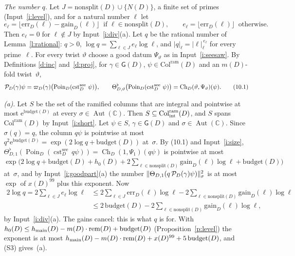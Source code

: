 \documentclass[11pt,a4paper]{article}
\makeatletter
\theoremstyle{plainx}
\theoremstyle{uprightx}
\renewenvironment{proof}[1][Proof]{\par\pushQED{\qed}\normalfont\topsep0pt\partopsep0pt
  \trivlist\item[\hskip\labelsep\itshape #1.]\ignorespaces}{\popQED\endtrivlist\@endpefalse}
\newcommand{\C}{\mathbb{C}}
\newcommand{\ee}{\mathrm{e}}
\newcommand{\AutC}{\operatorname{Aut}(\C)}
\newcommand{\scx}[1]{x(#1)}
\newcommand{\Dm}[1]{m(#1)}
\newcommand{\budget}[1]{\mathrm{budget}(#1)}
\newcommand{\hrow}[1]{h_{0}(#1)}
\newcommand{\Colram}[1]{\mathrm{Col}^{\mathrm{ram}}(#1)}
\newcommand{\GD}[1]{\mathsf{G}(#1)}
\newcommand{\Poin}[1]{\operatorname{Poin}_{#1}}
\newcommand{\gpt}[2]{\varpi_{#1}(#2)}
\newcommand{\Th}[2]{\Theta_{#1,#2}}
\newcommand{\Thf}[2]{\Theta^{\flat}_{#1,#2}}
\newcommand{\nsq}[2]{\|#1\|^{2}_{#2}}
\newcommand{\gain}[2]{\mathrm{gain}_{#1}(#2)}
\newcommand{\err}[2]{\mathrm{err}_{#1}(#2)}
\newcommand{\nonsplit}[1]{\mathrm{nonsplit}(#1)}
\newcommand{\Ch}[2]{\operatorname{Ch}_{#1}(#2)}
\newcommand{\cst}[2]{\operatorname{cst}^{\mathrm{#1}}_{#2}}
\makeatother
\begin{document}
\begin{proof}
\emph{The number $q$.} Let $J=\nonsplit{D}\cup\{N(D)\}$, a finite set of primes (Input~\ref{i:level}), and for a
natural number $\ell$ let
\[e_\ell=\bigl\lfloor\err{D}{\ell}-\gain{D}{\ell}\bigr\rfloor\ \text{ if }\ell\in\nonsplit{D},\qquad
e_\ell=\bigl\lfloor\err{D}{\ell}\bigr\rfloor\ \text{ otherwise.}\]
Then $e_\ell=0$ for $\ell\notin J$ by Input~\ref{i:div}(a). Let $q$ be the rational number of Lemma~\ref{l:rational}:
$q>0$, $\log q=\sum_{\ell\in J}e_\ell\log\ell$, and $|q|_\ell=|\ell|_\ell^{\,e_\ell}$ for every prime~$\ell$. For every
twist $\vartheta$ choose a good datum $\Psi_\vartheta$ as in Input~\ref{i:seesaw}. By Definitions \ref{d:inc}
and~\ref{d:proj}, for $\gamma\in\GD{D}$, $\psi\in\Colram{D}$ and an $\Dm{D}$-fold twist~$\vartheta$,
\[
\projectedPoincare{D}{\gamma}{\psi}=\gpt{D}{\gamma}\bigl(\Poin{D}(\cst{see}{D}\,\psi)\bigr),\qquad
\Thf{D}{\vartheta}\bigl(\Poin{D}(\cst{see}{D}\,\psi)\bigr)=\Ch{D}{\vartheta,\Psi_\vartheta}(\psi).\tag{10.1}
\]

\emph{(a).} Let $S$ be the set of the ramified columns that are integral and pointwise at most
$\ee^{\budget{D}}$ at every $\sigma\in\AutC$. Then $S\subseteq\mathrm{Col}^{\mathrm{ram}}_{\mathrm{int}}(D)$, and $S$ spans $\Colram{D}$ by
Input~\ref{i:short}. Let $\psi\in S$, $\gamma\in\GD{D}$ and $\sigma\in\AutC$. Since $\sigma(q)=q$, the column $q\psi$
is pointwise at most $q^{2}\ee^{\budget{D}}=\exp(2\log q+\budget{D})$ at~$\sigma$. By (10.1) and Input~\ref{i:size},
$\Thf{D}{1}(\Poin{D}(\cst{see}{D}\,q\psi))=\Ch{D}{1,\Psi_1}(q\psi)$ is pointwise at most
$\exp\bigl(2\log q+\budget{D}+\hrow{D}+2\sum_{\ell\in\nonsplit{D}}\gain{D}{\ell}\log\ell+\budget{D}\bigr)$ at~$\sigma$,
and by Input~\ref{i:goodpart}(a) the number $\nsq{\Th{D}{1}(q\,\projectedPoincare{D}{\gamma}{\psi})}{\sigma}$ is at
most $\exp$ of $\scx{D}^{99}$ plus this exponent. Now
\begin{align*}
2\log q=2\sum_{\ell\in J}e_\ell\log\ell
&\le2\sum_{\ell\in J}\err{D}{\ell}\log\ell-2\sum_{\ell\in\nonsplit{D}}\gain{D}{\ell}\log\ell\\
&\le2\,\budget{D}-2\sum_{\ell\in\nonsplit{D}}\gain{D}{\ell}\log\ell,
\end{align*}
by Input~\ref{i:div}(a). The gains cancel: this is what $q$ is for. With
$\hrow{D}\le\mainHeight{D}-\Dm{D}\cdot\remainder{D}+\budget{D}$ (Proposition~\ref{p:level}) the exponent is at most
$\mainHeight{D}-\Dm{D}\cdot\remainder{D}+\scx{D}^{99}+5\,\budget{D}$, and (S3) gives~(a).


\end{proof}
\end{document}
